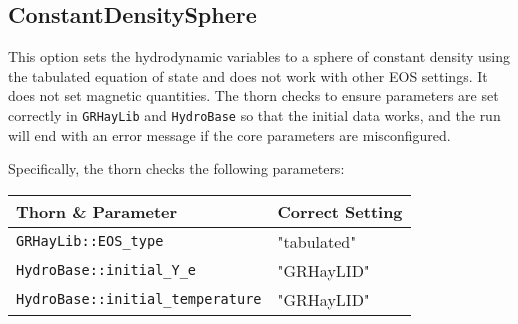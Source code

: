 \documentclass{article}
\newcommand{\glib}{\texttt{GRHayLib}\xspace}
\newcommand{\hbase}{\texttt{HydroBase}\xspace}
\begin{document}
\subsection{ConstantDensitySphere}

This option sets the hydrodynamic variables to a sphere of constant
density using the tabulated equation of state and does not work
with other EOS settings. It does not set magnetic quantities. The thorn
checks to ensure parameters are set correctly in \glib and
\hbase so that the initial data works, and the run will end
with an error message if the core parameters are misconfigured.

Specifically, the thorn checks the following parameters:
\begin{tabular}{l|l}
Thorn \& Parameter & Correct Setting \\\hline
\texttt{GRHayLib::EOS\_type} & "tabulated" \\
\texttt{HydroBase::initial\_Y\_e} & "GRHayLID" \\
\texttt{HydroBase::initial\_temperature} & "GRHayLID"
\end{tabular}

\end{document}
